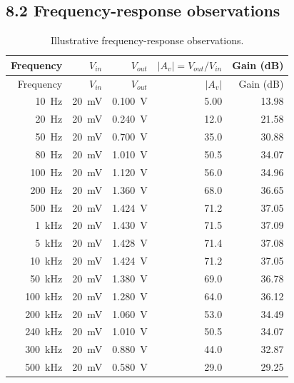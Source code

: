 \documentclass[11pt,a4paper]{article}
\begin{document}
\subsection*{8.2 Frequency-response observations}

\begin{center}
\small
\begin{longtable}{rrrrr}
\caption{Illustrative frequency-response observations.}
\label{tab:freqdata}\\
\toprule
Frequency &
$V_{in}$ &
$V_{out}$ &
$|A_v|=V_{out}/V_{in}$ &
Gain (dB) \\
\midrule
\endfirsthead

\toprule
Frequency &
$V_{in}$ &
$V_{out}$ &
$|A_v|$ &
Gain (dB) \\
\midrule
\endhead

\SI{10}{\hertz}   & \SI{20}{\milli\volt} & \SI{0.100}{\volt} & 5.00  & 13.98 \\
\SI{20}{\hertz}   & \SI{20}{\milli\volt} & \SI{0.240}{\volt} & 12.0  & 21.58 \\
\SI{50}{\hertz}   & \SI{20}{\milli\volt} & \SI{0.700}{\volt} & 35.0  & 30.88 \\
\SI{80}{\hertz}   & \SI{20}{\milli\volt} & \SI{1.010}{\volt} & 50.5  & 34.07 \\
\SI{100}{\hertz}  & \SI{20}{\milli\volt} & \SI{1.120}{\volt} & 56.0  & 34.96 \\
\SI{200}{\hertz}  & \SI{20}{\milli\volt} & \SI{1.360}{\volt} & 68.0  & 36.65 \\
\SI{500}{\hertz}  & \SI{20}{\milli\volt} & \SI{1.424}{\volt} & 71.2  & 37.05 \\
\SI{1}{\kilo\hertz}   & \SI{20}{\milli\volt} & \SI{1.430}{\volt} & 71.5  & 37.09 \\
\SI{5}{\kilo\hertz}   & \SI{20}{\milli\volt} & \SI{1.428}{\volt} & 71.4  & 37.08 \\
\SI{10}{\kilo\hertz}  & \SI{20}{\milli\volt} & \SI{1.424}{\volt} & 71.2  & 37.05 \\
\SI{50}{\kilo\hertz}  & \SI{20}{\milli\volt} & \SI{1.380}{\volt} & 69.0  & 36.78 \\
\SI{100}{\kilo\hertz} & \SI{20}{\milli\volt} & \SI{1.280}{\volt} & 64.0  & 36.12 \\
\SI{200}{\kilo\hertz} & \SI{20}{\milli\volt} & \SI{1.060}{\volt} & 53.0  & 34.49 \\
\SI{240}{\kilo\hertz} & \SI{20}{\milli\volt} & \SI{1.010}{\volt} & 50.5  & 34.07 \\
\SI{300}{\kilo\hertz} & \SI{20}{\milli\volt} & \SI{0.880}{\volt} & 44.0  & 32.87 \\
\SI{500}{\kilo\hertz} & \SI{20}{\milli\volt} & \SI{0.580}{\volt} & 29.0  & 29.25 \\
\bottomrule
\end{longtable}
\end{center}
\end{document}
